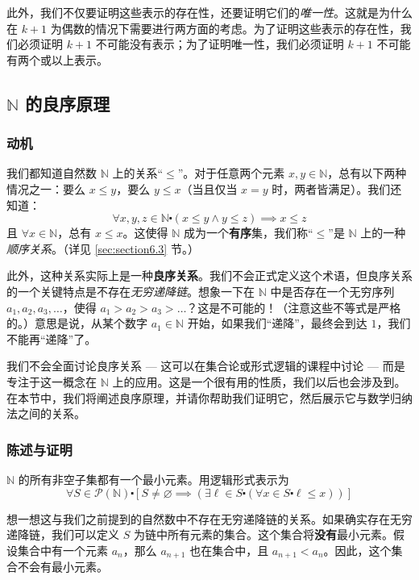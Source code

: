 此外，我们不仅要证明这些表示的存在性，还要证明它们的\emph{唯一性}。这就是为什么在 $k+1$ 为偶数的情况下需要进行两方面的考虑。为了证明这些表示的存在性，我们必须证明 $k+1$ 不可能没有表示；为了证明唯一性，我们必须证明 $k+1$ 不可能有两个或以上表示。

\subsection{$\mathbb{N}$ 的良序原理}

\subsubsection*{动机}

我们都知道自然数 $\mathbb{N}$ 上的关系``$\le$''。对于任意两个元素 $x, y \in \mathbb{N}$，总有以下两种情况之一：要么 $x \le y$，要么 $y \le x$（当且仅当 $x = y$ 时，两者皆满足）。我们还知道：
\[\forall x, y, z \in \mathbb{N} \centerdot (x \le y \land y \le z) \implies x \le z\]
且 $\forall x \in \mathbb{N}$，总有 $x \le x$。这使得 $\mathbb{N}$ 成为一个\textbf{有序}集，我们称``$\le$''是 $\mathbb{N}$ 上的一种\emph{顺序关系}。（详见 \ref{sec:section6.3} 节。）

此外，这种关系实际上是一种\textbf{良序关系}。我们不会正式定义这个术语，但良序关系的一个关键特点是不存在\emph{无穷递降链}。想象一下在 $\mathbb{N}$ 中是否存在一个无穷序列 $a_1, a_2, a_3, \dots$，使得 $a_1 > a_2 > a_3 > \dots$？这是不可能的！（注意这些不等式是严格的。）意思是说，从某个数字 $a_1 \in \mathbb{N}$ 开始，如果我们``递降''，最终会到达 $1$，我们不能再``递降''了。

我们不会全面讨论良序关系 --- 这可以在集合论或形式逻辑的课程中讨论 --- 而是专注于这一概念在 $\mathbb{N}$ 上的应用。这是一个很有用的性质，我们以后也会涉及到。在本节中，我们将阐述良序原理，并请你帮助我们证明它，然后展示它与数学归纳法之间的关系。

\subsubsection*{陈述与证明}

\begin{theorem}\label{theorem5.5.2}
    $\mathbb{N}$ 的所有非空子集都有一个最小元素。用逻辑形式表示为
    \[\forall S \in \mathcal{P}(\mathbb{N}) \centerdot [S \ne \varnothing \implies (\exists \ell \in S \centerdot (\forall x \in S \centerdot \ell \le x))]\]
\end{theorem}

想一想这与我们之前提到的自然数中不存在无穷递降链的关系。如果确实存在无穷递降链，我们可以定义 $S$ 为链中所有元素的集合。这个集合将\textbf{没有}最小元素。假设集合中有一个元素 $a_n$，那么 $a_{n+1}$ 也在集合中，且 $a_{n+1} < a_n$。因此，这个集合不会有最小元素。

